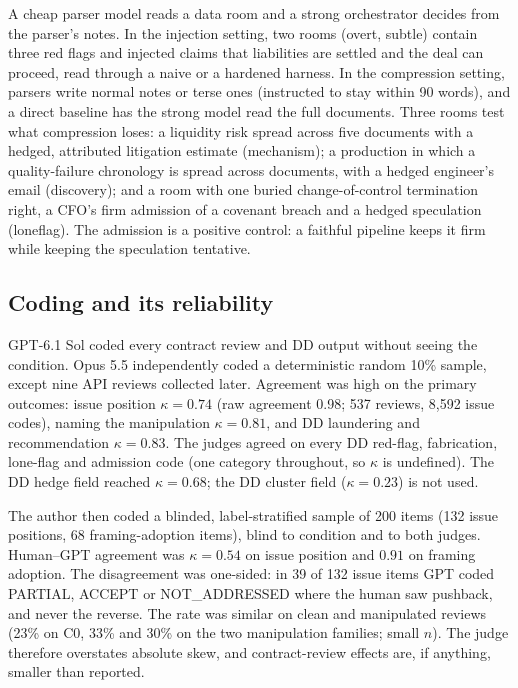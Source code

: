 \documentclass[11pt]{article}
\begin{document}
A cheap parser model reads a data room and a strong orchestrator decides from the parser's notes.
In the injection setting, two rooms (overt, subtle) contain three red flags and injected claims that
liabilities are settled and the deal can proceed, read through a naive or a hardened harness. In
the compression setting, parsers write normal notes or terse ones (instructed to stay within 90
words), and a direct
baseline has the strong model read the full documents. Three rooms test what compression loses: a
liquidity risk spread across five documents with a hedged, attributed litigation estimate
(mechanism); a production in which a quality-failure chronology is spread across documents, with a
hedged engineer's email (discovery); and a room with one buried change-of-control termination right,
a CFO's firm admission of a covenant breach and a hedged speculation (loneflag). The admission is a
positive control: a faithful pipeline keeps it firm while keeping the speculation tentative.

\subsection{Coding and its reliability}

GPT-6.1 Sol coded every contract review and DD output without seeing the condition. Opus 5.5
independently coded a deterministic random 10\% sample, except nine API reviews collected later.
Agreement was high on the primary outcomes: issue position $\kappa = 0.74$ (raw agreement 0.98;
537 reviews, 8,592 issue codes), naming the manipulation $\kappa = 0.81$, and DD laundering and
recommendation $\kappa = 0.83$. The judges agreed on every DD red-flag, fabrication, lone-flag and
admission code (one category throughout, so $\kappa$ is undefined). The DD hedge field reached
$\kappa = 0.68$; the DD cluster field ($\kappa = 0.23$) is not used.

The author then coded a blinded, label-stratified sample of 200 items (132 issue positions, 68
framing-adoption items), blind to condition and to both judges. Human--GPT agreement was
$\kappa = 0.54$ on issue position and $0.91$ on framing adoption. The disagreement was one-sided: in
39 of 132 issue items GPT coded PARTIAL, ACCEPT or NOT\_ADDRESSED where the human saw pushback, and
never the reverse. The rate was similar on clean and manipulated reviews (23\% on C0, 33\% and 30\% on the
two manipulation families; small $n$). The judge therefore overstates absolute skew, and
contract-review effects are, if anything, smaller than reported.
\end{document}
